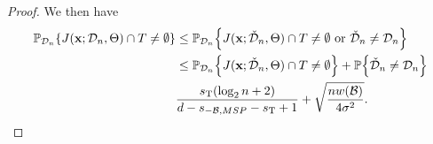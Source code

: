 \documentclass[11pt]{article}
\newtheorem{proposition}[theorem]{Proposition}
\newcommand{\bx}{\mathbf{x}}
\DeclarePairedDelimiter{\braces}{\lbrace}{\rbrace}
\DeclarePairedDelimiter{\paren}{(}{)}
\renewcommand{\P}{\mathbb{P}}
\renewcommand{\xspace}{\mathcal{X}}
\newcommand{\sparsity}{s}
\newcommand{\nfeats}{d}
\newcommand{\nsamples}{n}
\newcommand{\coordindices}{[\nfeats]}
\newcommand{\data}[1][n]{\mathcal{D}_{#1}}
\newcommand{\featindices}{J}
\newcommand{\MSP}{\textsf{MSP}}
\newcommand{\splitrule}{\mathcal{R}_{\textnormal{split}}}
\newcommand{\cutset}{\mathcal{B}}
\newcommand{\modifieddata}{\check{\mathcal{D}}_\nsamples}
\newcommand{\traversal}{T}
\newcommand{\fcoefs}{\mathcal{S}}
\newcommand{\fremain}{\fcoefs_{-}}
\newcommand{\traversalsize}{\sparsity_{\operatorname{T}}}
\begin{document}
\begin{proof}
    We then have
    \begin{equation}
        \begin{split}
            \P_{\data}\braces*{J(\bx;\data,\Theta)\cap \traversal \neq \emptyset } & \leq \P_{\data}\braces*{J(\bx;\modifieddata,\Theta)\cap \traversal \neq \emptyset ~\text{or}~ \modifieddata \neq \data} \\
            & \leq \P_{\data}\braces*{J(\bx;\modifieddata,\Theta)\cap \traversal \neq \emptyset} + \P\braces*{\modifieddata \neq \data} \\
            & \frac{\traversalsize(\log_2 \nsamples + 2)}{\nfeats - \sparsity_{-\cutset,\MSP}-\traversalsize +1} + \sqrt{\frac{\nsamples w(\cutset)}{4\sigma^2}}. \qedhere
        \end{split}
    \end{equation}
\end{proof}

\end{document}
